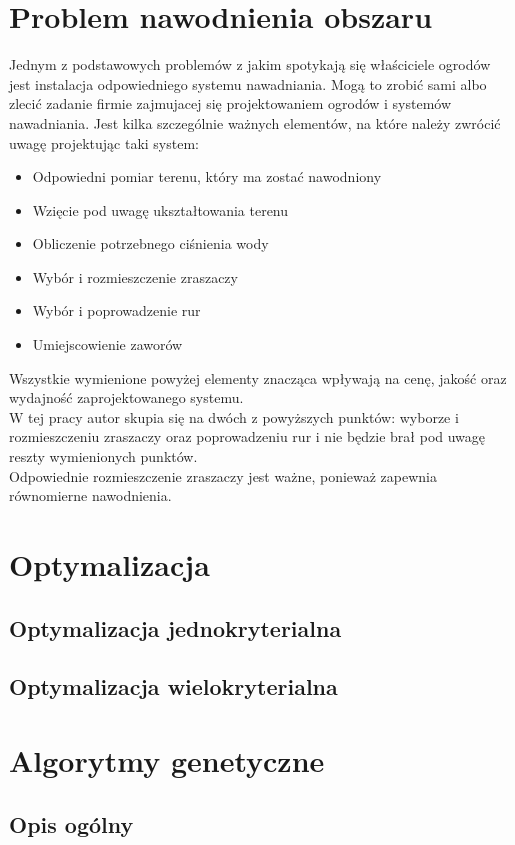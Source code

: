\documentclass[twoside]{iisthesis}
\begin{document}
\chapter{Problem nawodnienia obszaru}
Jednym z podstawowych problemów z jakim spotykają się właściciele ogrodów jest instalacja odpowiedniego systemu nawadniania. Mogą to zrobić sami albo zlecić zadanie firmie zajmujacej się projektowaniem ogrodów i systemów nawadniania.
Jest kilka szczególnie ważnych elementów, na które należy zwrócić uwagę projektując taki system:
\begin{itemize}
	\item Odpowiedni pomiar terenu, który ma zostać nawodniony
	\item Wzięcie pod uwagę ukształtowania terenu
	\item Obliczenie potrzebnego ciśnienia wody
	\item Wybór i rozmieszczenie zraszaczy
	\item Wybór i poprowadzenie rur
	\item Umiejscowienie zaworów
\end{itemize}
Wszystkie wymienione powyżej elementy znacząca wpływają na cenę, jakość oraz wydajność zaprojektowanego systemu.\\
W tej pracy autor skupia się na dwóch z powyższych punktów: wyborze i rozmieszczeniu zraszaczy oraz poprowadzeniu rur i nie będzie brał pod uwagę reszty wymienionych punktów.\\
Odpowiednie rozmieszczenie zraszaczy jest ważne, ponieważ zapewnia równomierne nawodnienia.

\chapter{Optymalizacja}
\section{Optymalizacja jednokryterialna}
\section{Optymalizacja wielokryterialna}

\chapter{Algorytmy genetyczne}
\section{Opis ogólny}
\end{document}
